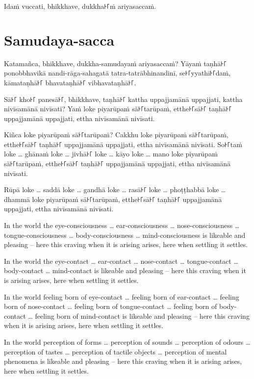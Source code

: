 Idaṁ vuccati, bhikkhave, dukkha꜔꜒ṁ ariyasaccaṁ.

\section*{Samudaya-sacca}

Katamañca, bhikkhave, dukkha-samudayaṁ ariyasaccaṁ? Yāyaṁ taṇhā꜔꜒ ponobbhavikā
nandi-rāga-sahagatā tatra-tatrābhinandinī, se꜔꜒yyathī꜔꜒daṁ, kāmataṇhā꜔꜒ bhavataṇhā꜔꜒
vibhavataṇhā꜔꜒.

Sā꜔꜒ kho꜔꜒ panesā꜔꜒, bhikkhave, taṇhā꜔꜒ kattha uppajjamānā uppajjati, kattha nivīsamānā
nivīsati? Yaṁ loke piyarūpaṁ sā꜔꜒tarūpaṁ, etthe꜔꜒sā꜔꜒ taṇhā꜔꜒ uppajjamānā uppajjati,
ettha nivīsamānā nivīsati.

\enlargethispage{\baselineskip}

Kiñca loke piyarūpaṁ sā꜔꜒tarūpaṁ? Cakkhu loke piyarūpaṁ sā꜔꜒tarūpaṁ, etthe꜔꜒sā꜔꜒ taṇhā꜔꜒
uppajjamānā uppajjati, ettha nivīsamānā nivīsati. So꜔꜒taṁ loke
\ldots{} ghānaṁ loke \ldots{} jivhā꜔꜒ loke \ldots{} kāyo loke \ldots{} mano loke
piyarūpaṁ sā꜔꜒tarūpaṁ, etthe꜔꜒sā꜔꜒ taṇhā꜔꜒ uppajjamānā uppajjati, ettha nivīsamānā
nivīsati.

Rūpā loke \ldots{} saddā loke \ldots{} gandhā loke \ldots{} rasā꜔꜒ loke \ldots{}
phoṭṭhabbā loke \ldots{} dhammā loke piyarūpaṁ sā꜔꜒tarūpaṁ, etthe꜔꜒sā꜔꜒ taṇhā꜔꜒
uppajjamānā uppajjati, ettha nivīsamānā nivīsati.

\englishPage

In the world the eye-consciousness \ldots{} ear-consciousness \ldots{} nose-consciousness
 \ldots{} tongue-consciousness \ldots{} body-consciousness \ldots{} mind-consciousness is likeable
and pleasing -- here this craving when it is arising arises, here when settling
it settles.

In the world the eye-contact \ldots{} ear-contact \ldots{} nose-contact \ldots{}
tongue-contact \ldots{} body-contact \ldots{} mind-contact is likeable and
pleasing -- here this craving when it is arising arises, here when settling it
settles.

In the world feeling born of eye-contact \ldots{} feeling born of ear-contact
\ldots{} feeling born of nose-contact \ldots{} feeling born of tongue-contact
\ldots{} feeling born of body-contact \ldots{} feeling born of mind-contact is
likeable and pleasing -- here this craving when it is arising arises, here when
settling it settles.

In the world perception of forms \ldots{} perception of sounds \ldots{}
perception of odours \ldots{} perception of tastes \ldots{} perception of
tactile objects \ldots{} perception of mental phenomena is likeable and pleasing
-- here this craving when it is arising arises, here when settling it settles.

